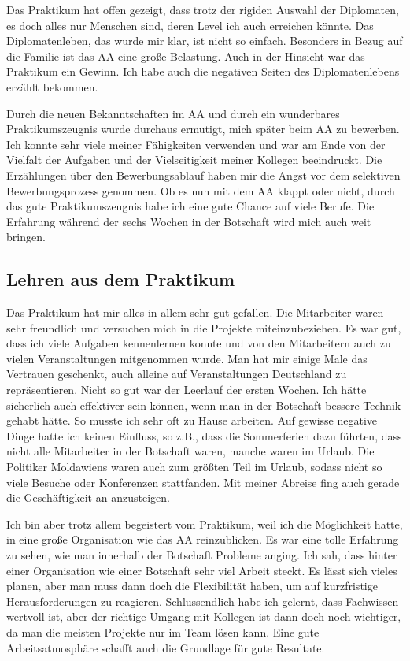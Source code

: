 \documentclass{../../sem_paper}
\begin{document}
Das Praktikum hat offen gezeigt, dass trotz der rigiden Auswahl der Diplomaten, es doch alles nur Menschen sind, deren Level ich auch erreichen könnte. Das Diplomatenleben, das wurde mir klar, ist nicht so einfach. Besonders in Bezug auf die Familie ist das AA eine große Belastung. Auch in der Hinsicht war das Praktikum ein Gewinn. Ich habe auch die negativen Seiten des Diplomatenlebens erzählt bekommen.

Durch die neuen Bekanntschaften im AA und durch ein wunderbares Praktikumszeugnis wurde durchaus ermutigt, mich später beim AA zu bewerben. Ich konnte sehr viele meiner Fähigkeiten verwenden und war am Ende von der Vielfalt der Aufgaben und der Vielseitigkeit meiner Kollegen beeindruckt. Die Erzählungen über den Bewerbungsablauf haben mir die Angst vor dem selektiven Bewerbungsprozess genommen. Ob es nun mit dem AA klappt oder nicht, durch das gute Praktikumszeugnis habe ich eine gute Chance auf viele Berufe. Die Erfahrung während der sechs Wochen in der Botschaft wird mich auch weit bringen.

\subsection{Lehren aus dem Praktikum}
Das Praktikum hat mir alles in allem sehr gut gefallen. Die Mitarbeiter waren sehr freundlich und versuchen mich in die Projekte miteinzubeziehen. Es war gut, dass ich viele Aufgaben kennenlernen konnte und von den Mitarbeitern auch zu vielen Veranstaltungen mitgenommen wurde. Man hat mir einige Male das Vertrauen geschenkt, auch alleine auf Veranstaltungen Deutschland zu repräsentieren. Nicht so gut war der Leerlauf der ersten Wochen. Ich hätte sicherlich auch effektiver sein können, wenn man in der Botschaft bessere Technik gehabt hätte. So musste ich sehr oft zu Hause arbeiten. Auf gewisse negative Dinge hatte ich keinen Einfluss, so z.B., dass die Sommerferien dazu führten, dass nicht alle Mitarbeiter in der Botschaft waren, manche waren im Urlaub. Die Politiker Moldawiens waren auch zum größten Teil im Urlaub, sodass nicht so viele Besuche oder Konferenzen stattfanden. Mit meiner Abreise fing auch gerade die Geschäftigkeit an anzusteigen.

Ich bin aber trotz allem begeistert vom Praktikum, weil ich die Möglichkeit hatte, in eine große Organisation wie das AA reinzublicken. Es war eine tolle Erfahrung zu sehen, wie man innerhalb der Botschaft Probleme anging. Ich sah, dass hinter einer Organisation wie einer Botschaft sehr viel Arbeit steckt. Es lässt sich vieles planen, aber man muss dann doch die Flexibilität haben, um auf kurzfristige Herausforderungen zu reagieren. Schlussendlich habe ich gelernt, dass Fachwissen wertvoll ist, aber der richtige Umgang mit Kollegen ist dann doch noch wichtiger, da man die meisten Projekte nur im Team lösen kann. Eine gute Arbeitsatmosphäre schafft auch die Grundlage für gute Resultate.
\end{document}
